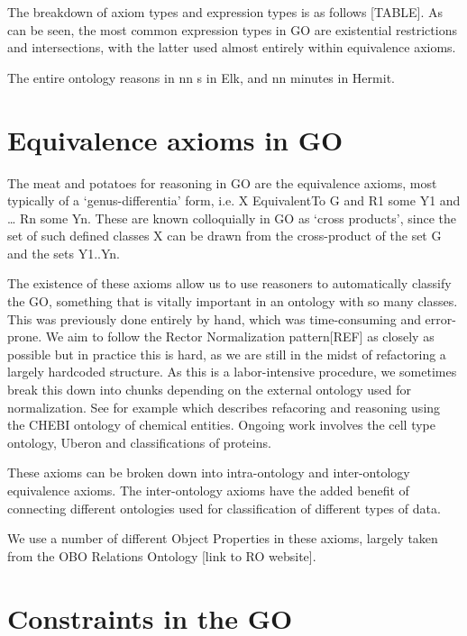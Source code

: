 \documentclass{llncs}
\begin{document}
The breakdown of axiom types and expression types is as follows [TABLE]. As can be seen, the most common expression types in GO are existential restrictions and intersections, with the latter used almost entirely within equivalence axioms.

The entire ontology reasons in nn s in Elk\cite{Kazakov2014}, and nn minutes in Hermit.

\section{Equivalence axioms in GO}


The meat and potatoes for reasoning in GO are the equivalence axioms, most typically of a ‘genus-differentia’ form, i.e. X EquivalentTo G and R1 some Y1 and … Rn some Yn. These are known colloquially in GO as ‘cross products’, since the set of such defined classes X can be drawn from the cross-product of the set G and the sets Y1..Yn.

The existence of these axioms allow us to use reasoners to automatically classify the GO, something that is vitally important in an ontology with so many classes. This was previously done entirely by hand, which was time-consuming and error-prone. We aim to follow the Rector Normalization pattern[REF] as closely as possible but in practice this is hard, as we are still in the midst of refactoring a largely hardcoded structure. As this is a labor-intensive procedure, we sometimes break this down into chunks depending on the external ontology used for normalization. See for example \cite{Hill2013} which describes refacoring and reasoning using the CHEBI ontology of chemical entities. Ongoing work involves the cell type ontology, Uberon and classifications of proteins.

These axioms can be broken down into intra-ontology and inter-ontology equivalence axioms. %
The inter-ontology axioms have the added benefit of connecting different ontologies used for classification of different types of data.

We use a number of different Object Properties in these axioms, largely taken from the OBO Relations Ontology [link to RO website].

\section{Constraints in the GO}
\end{document}
